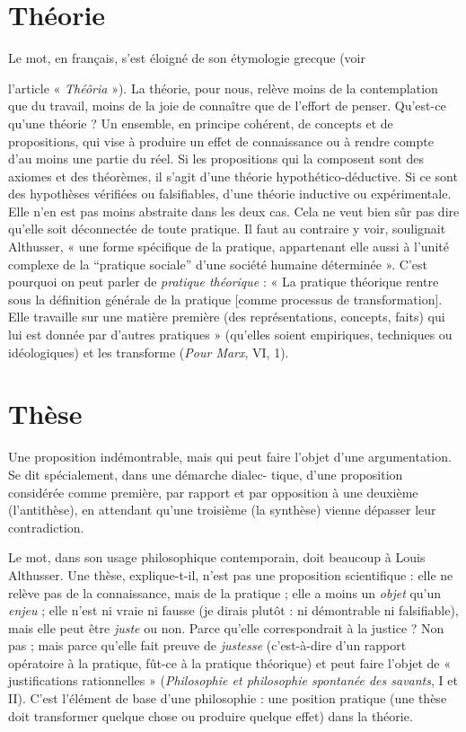 \section{Théorie}
Le mot, en français, s’est éloigné de son étymologie grecque (voir

l'article « {\it Théôria} »). La théorie, pour nous, relève moins de la
contemplation que du travail, moins de la joie de connaître que de l'effort de
penser. Qu’est-ce qu’une théorie ? Un ensemble, en principe cohérent, de concepts
et de propositions, qui vise à produire un effet de connaissance ou à
rendre compte d’au moins une partie du réel. Si les propositions qui la composent
sont des axiomes et des théorèmes, il s’agit d’une théorie hypothético-déductive.
Si ce sont des hypothèses vérifiées ou falsifiables, d’une théorie
inductive ou expérimentale. Elle n’en est pas moins abstraite dans les deux cas.
Cela ne veut bien sûr pas dire qu’elle soit déconnectée de toute pratique. Il faut
au contraire y voir, soulignait Althusser, « une forme spécifique de la pratique,
appartenant elle aussi à l’unité complexe de la “pratique sociale” d’une société
humaine déterminée ». C’est pourquoi on peut parler de {\it pratique théorique} : « La
pratique théorique rentre sous la définition générale de la pratique [comme processus
de transformation]. Elle travaille sur une matière première (des représentations,
concepts, faits) qui lui est donnée par d’autres pratiques » (qu’elles soient
empiriques, techniques ou idéologiques) et les transforme ({\it Pour Marx}, VI, 1).

\section{Thèse}
Une proposition indémontrable, mais qui peut faire l’objet d’une
argumentation. Se dit spécialement, dans une démarche dialec-
tique, d’une proposition considérée comme première, par rapport et par opposition
à une deuxième (l'antithèse), en attendant qu’une troisième (la synthèse)
vienne dépasser leur contradiction.

Le mot, dans son usage philosophique contemporain, doit beaucoup à
Louis Althusser. Une thèse, explique-t-il, n’est pas une proposition scientifique :
elle ne relève pas de la connaissance, mais de la pratique ; elle a moins
un {\it objet} qu’un {\it enjeu} ; elle n’est ni vraie ni fausse (je dirais plutôt : ni démontrable
ni falsifiable), mais elle peut être {\it juste} ou non. Parce qu’elle correspondrait
à la justice ? Non pas ; mais parce qu’elle fait preuve de {\it justesse} (c’est-à-dire
d’un rapport opératoire à la pratique, fût-ce à la pratique théorique) et
peut faire l’objet de « justifications rationnelles » ({\it Philosophie et philosophie
spontanée des savants}, I et II). C’est l'élément de base d’une philosophie : une
position pratique (une thèse doit transformer quelque chose ou produire
quelque effet) dans la théorie.

